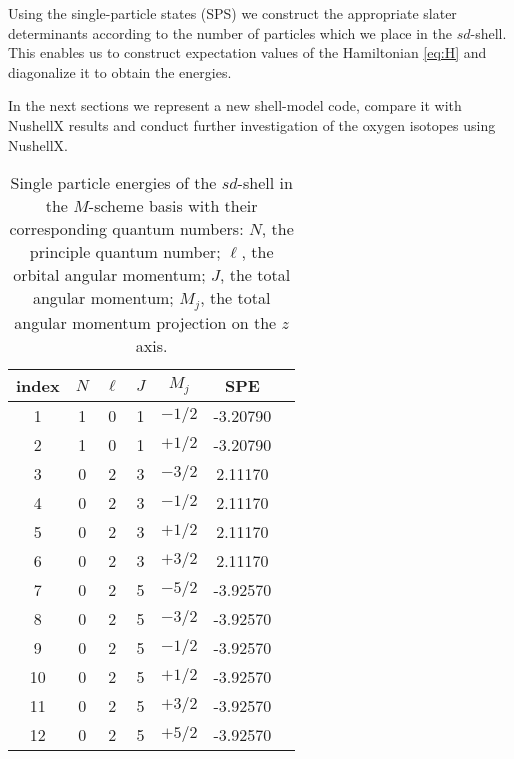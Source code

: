 Using the single-particle states (SPS) we construct the appropriate slater determinants according to the number of particles which we place in the $sd$-shell. This enables us to construct expectation values of the Hamiltonian \eqref{eq:H} and diagonalize it to obtain the energies. 

In the next sections we represent a new shell-model code, compare it with NushellX results and conduct further investigation of the oxygen isotopes using NushellX.

\begin{table}[H]
\caption{Single particle energies of the $sd$-shell in the $M$-scheme basis with their corresponding quantum numbers: $N$, the principle quantum number; $\ell$, the orbital angular momentum; $J$, the total angular momentum; $M_j$, the total angular momentum projection on the $z$ axis. \label{tab:SPE}}
\begin{ruledtabular}
\begin{tabular}{c|cccccc}
index	&	$N$	&	$\ell$	&	$J$	&	$M_j$	&	SPE			\\
\hline 
1		&	1	&	0		&	1	&	$-1/2$	&	-3.20790	\\
2		&	1	&	0		&	1	&	$+1/2$	&	-3.20790	\\
3		& 	0	&	2		&	3	&	$-3/2$	&	 2.11170	\\
4		&	0	&	2		&	3	&	$-1/2$	&	 2.11170	\\
5		&	0	&	2		&	3	&	$+1/2$	&	 2.11170	\\
6		&	0	&	2		&	3	&	$+3/2$	&	 2.11170	\\
7		&	0	&	2		&	5	&	$-5/2$	&	-3.92570	\\
8		&	0	&	2		&	5	&	$-3/2$	&	-3.92570	\\
9		&	0	&	2		&	5	&	$-1/2$	&	-3.92570	\\
10		&	0	&	2		&	5	&	$+1/2$	&	-3.92570	\\
11		&	0	&	2		&	5	&	$+3/2$	&	-3.92570	\\
12		&	0	&	2		&	5	&	$+5/2$	&	-3.92570	
\end{tabular}
\end{ruledtabular}
\end{table}